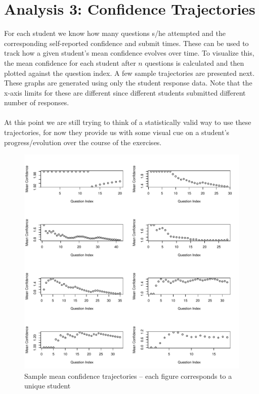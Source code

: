 \documentclass[11pt]{article} %
\begin{document}
\section{Analysis 3: Confidence Trajectories}
For each student we know how many questions s/he attempted and the corresponding self-reported confidence and submit times. These can be used to track how a given student's mean confidence evolves over time. To visualize this, the mean confidence for each student after $n$ questions is calculated and then plotted against the question index. A few sample trajectories are presented next. These graphs are generated using only the student response data. Note that the x-axis limits for these are different since different students submitted different number of responses. \\\\
At this point we are still trying to think of a statistically valid way to use these trajectories, for now they provide us with some visual cue on a student's progress/evolution over the course of the exercises. 
\begin{figure}[H]
\centering
\caption{Sample mean confidence trajectories -- each figure corresponds to a unique student}
\includegraphics[width =  \textwidth]{trajectories1.pdf}
\end{figure}
\end{document}
